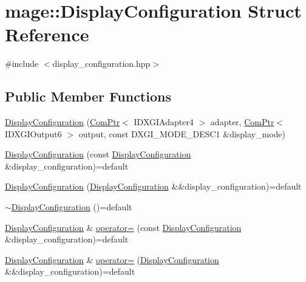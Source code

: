 \hypertarget{structmage_1_1_display_configuration}{}\section{mage\+:\+:Display\+Configuration Struct Reference}
\label{structmage_1_1_display_configuration}


{\ttfamily \#include $<$display\+\_\+configuration.\+hpp$>$}

\subsection*{Public Member Functions}
\begin{DoxyCompactItemize}
\item 
\hyperlink{structmage_1_1_display_configuration_a2ca58b8cc3b408c50fccb9cf94eb5dc6}{Display\+Configuration} (\hyperlink{namespacemage_ae74f374780900893caa5555d1031fd79}{Com\+Ptr}$<$ I\+D\+X\+G\+I\+Adapter4 $>$ adapter, \hyperlink{namespacemage_ae74f374780900893caa5555d1031fd79}{Com\+Ptr}$<$ I\+D\+X\+G\+I\+Output6 $>$ output, const D\+X\+G\+I\+\_\+\+M\+O\+D\+E\+\_\+\+D\+E\+S\+C1 \&display\+\_\+mode)
\item 
\hyperlink{structmage_1_1_display_configuration_a1b99f5eb69a7ec1e525d551a8004f508}{Display\+Configuration} (const \hyperlink{structmage_1_1_display_configuration}{Display\+Configuration} \&display\+\_\+configuration)=default
\item 
\hyperlink{structmage_1_1_display_configuration_a5adbfbaf7de92292af56b2b56f76d548}{Display\+Configuration} (\hyperlink{structmage_1_1_display_configuration}{Display\+Configuration} \&\&display\+\_\+configuration)=default
\item 
\hyperlink{structmage_1_1_display_configuration_a91cdf4f2015177e41290238d96a55328}{$\sim$\+Display\+Configuration} ()=default
\item 
\hyperlink{structmage_1_1_display_configuration}{Display\+Configuration} \& \hyperlink{structmage_1_1_display_configuration_a43d4997e418b27add46442e88ba3672b}{operator=} (const \hyperlink{structmage_1_1_display_configuration}{Display\+Configuration} \&display\+\_\+configuration)=default
\item 
\hyperlink{structmage_1_1_display_configuration}{Display\+Configuration} \& \hyperlink{structmage_1_1_display_configuration_a56c175220b8f597afd7d5d6275b5d0de}{operator=} (\hyperlink{structmage_1_1_display_configuration}{Display\+Configuration} \&\&display\+\_\+configuration)=default

\end{DoxyCompactItemize}
